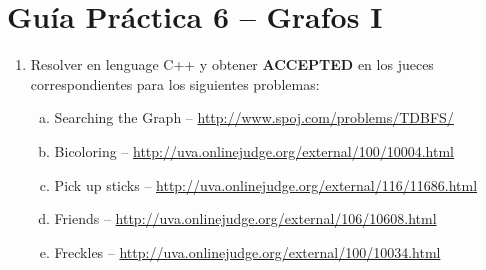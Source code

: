 




\section*{Gu\'ia Pr\'actica 6 -- Grafos I}

\begin{enumerate}[1 -]
	
	\item Resolver en lenguage C++ y obtener \textbf{ACCEPTED} en los jueces correspondientes para los siguientes problemas:
	
	\begin{enumerate}[a)]	
		\item  Searching the Graph -- \href{http://www.spoj.com/problems/TDBFS/}{http://www.spoj.com/problems/TDBFS/}
		\item  Bicoloring -- \href{http://uva.onlinejudge.org/external/100/10004.html}{http://uva.onlinejudge.org/external/100/10004.html}
		\item  Pick up sticks -- \href{http://uva.onlinejudge.org/external/116/11686.html}{http://uva.onlinejudge.org/external/116/11686.html}
		\item Friends -- \href{http://uva.onlinejudge.org/external/106/10608.html}{http://uva.onlinejudge.org/external/106/10608.html}
		\item Freckles -- \href{http://uva.onlinejudge.org/external/100/10034.html}{http://uva.onlinejudge.org/external/100/10034.html}




		


	\end{enumerate}
\end{enumerate}


